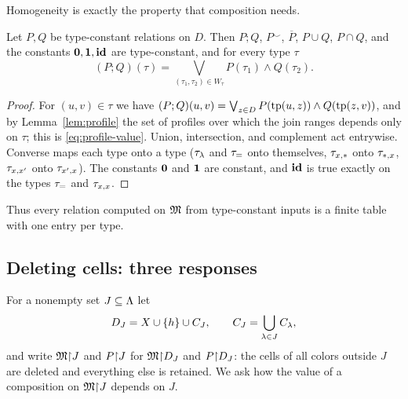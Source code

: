 Homogeneity is exactly the property that composition needs.
\begin{corollary}\label{cor:closure}
Let $P,Q$ be type-constant relations on $D$. Then $P;Q$, $P^\smile$,
$\overline P$, $P\cup Q$, $P\cap Q$, and the constants $\mathbf{0},\mathbf{1},\mathbf{id}$ are
type-constant, and for every type $\tau$
\begin{equation}\label{eq:profile-value}
 (P;Q)(\tau)=\bigvee_{(\tau_1,\tau_2)\in W_\tau}P(\tau_1)\land Q(\tau_2).
\end{equation}
\end{corollary}
\begin{proof}
For $(u,v)\in\tau$ we have
$(P;Q)(u,v)=\bigvee_{z\in D}P(\operatorname{tp}(u,z))\land Q(\operatorname{tp}(z,v))$, and by
Lemma~\ref{lem:profile} the set of profiles over which the join ranges
depends only on $\tau$; this is \eqref{eq:profile-value}. Union,
intersection, and complement act entrywise. Converse maps each type onto a
type ($\tau_{\lambda}$ and $\tau_{=}$ onto themselves, $\tau_{x,\ast}$ onto $\tau_{\ast,x}$,
$\tau_{x,x'}$ onto $\tau_{x',x}$). The constants $\mathbf{0}$ and $\mathbf{1}$ are constant,
and $\mathbf{id}$ is true exactly on the types $\tau_{=}$ and $\tau_{x,x}$.
\end{proof}
Thus every relation computed on $\mathfrak M$ from type-constant inputs is a finite
table with one entry per type.

\subsection{Deleting cells: three responses}\label{sec:responses}
For a nonempty set $J\subseteq\Lambda$ let
\[
 D_J=X\cup\{h\}\cup C_{J},\qquad C_{J}=\bigcup_{\lambda\in J}C_{\lambda},
\]
and write $\mathfrak M\mathord{\restriction} J$ and $P\mathord{\restriction} J$ for $\mathfrak M\mathord{\restriction} D_J$ and $P\mathord{\restriction} D_J$: the
cells of all colors outside $J$ are deleted and everything else is
retained. We ask how the value of a composition on $\mathfrak M\mathord{\restriction} J$ depends on
$J$.

